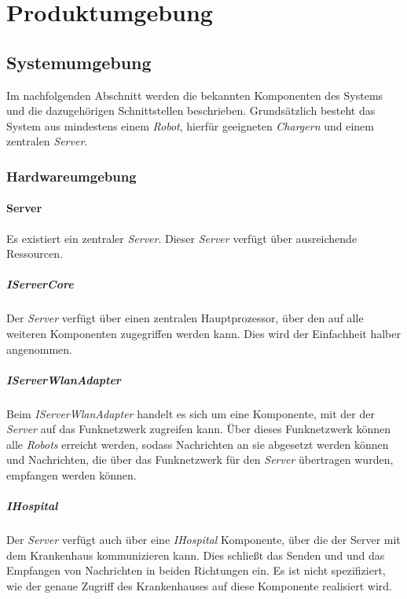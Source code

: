 \section{Produktumgebung}

  \subsection{Systemumgebung}
  Im nachfolgenden Abschnitt werden die bekannten Komponenten des Systems
  und die dazugehörigen Schnittstellen beschrieben. Grundsätzlich besteht
  das System aus mindestens einem \emph{Robot}, hierfür geeigneten
  \emph{Chargern} und einem zentralen \emph{Server}.

    \subsubsection{Hardwareumgebung}
    \paragraph{Server}\label{server}

    Es existiert ein zentraler \emph{Server}. Dieser \emph{Server} verfügt
    über ausreichende Ressourcen.

    \subparagraph{IServerCore}\label{iservercore}

    Der \emph{Server} verfügt über einen zentralen Hauptprozessor, über den
    auf alle weiteren Komponenten zugegriffen werden kann. Dies wird der
    Einfachheit halber angenommen.

    \subparagraph{IServerWlanAdapter}\label{iserverwlanadapter}

    Beim \emph{IServerWlanAdapter} handelt es sich um eine Komponente, mit der der \emph{Server}
    auf das Funknetzwerk zugreifen kann. Über dieses Funknetzwerk können alle
    \emph{Robots} erreicht werden, sodass Nachrichten an sie abgesetzt werden können
    und Nachrichten, die über das Funknetzwerk für den \emph{Server} übertragen wurden,
    empfangen werden können.

    \subparagraph{IHospital}\label{ihospital}

    Der \emph{Server} verfügt auch über eine \emph{IHospital} Komponente, über die
    der Server mit dem Krankenhaus kommunizieren kann. Dies schließt das Senden und
    und das Empfangen von Nachrichten in beiden Richtungen ein. Es ist nicht spezifiziert,
    wie der genaue Zugriff des Krankenhauses auf diese Komponente realisiert wird.

